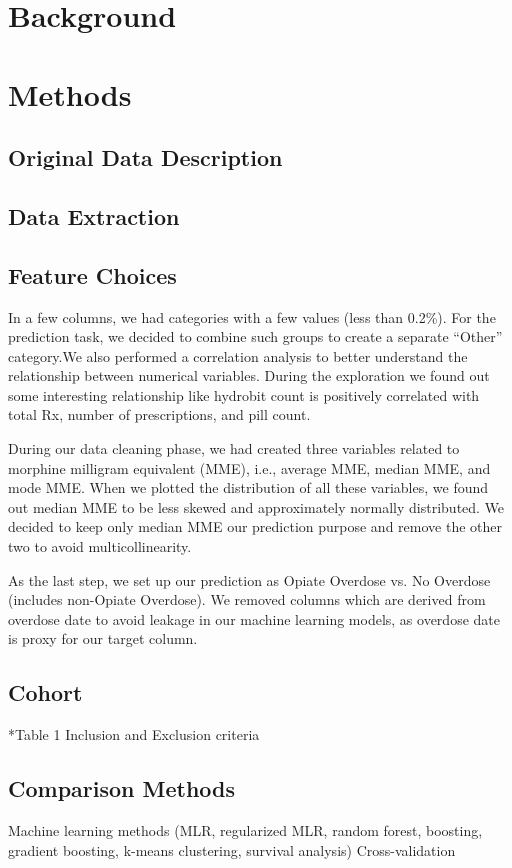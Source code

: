 \documentclass[twoside,10.5pt]{article}
\begin{document}
\section{Background}


\section{Methods}
\subsection{Original Data Description}

\subsection{Data Extraction}

\subsection{Feature Choices}
In a few columns, we had categories with a few values (less than 0.2\%). For the prediction task, we decided to combine such groups to create a separate “Other” category.We also performed a correlation analysis to better understand the relationship between numerical variables. During the exploration we found out some interesting relationship like hydrobit count is positively correlated with total Rx, number of prescriptions, and pill count.

During our data cleaning phase, we had created three variables related to morphine milligram equivalent (MME), i.e., average MME, median MME, and mode MME.  When we plotted the distribution of all these variables, we found out median MME to be less skewed and approximately normally distributed. We decided to keep only median MME our prediction purpose and remove the other two to avoid multicollinearity.

As the last step, we set up our prediction as Opiate Overdose vs. No Overdose (includes non-Opiate Overdose). We removed columns which are derived from overdose date to avoid leakage in our machine learning models, as overdose date is proxy for our target column.


\subsection{Cohort}
*Table 1
Inclusion and Exclusion criteria 


\subsection{Comparison Methods}
Machine learning methods (MLR, regularized MLR, random forest, boosting, gradient boosting, k-means clustering, survival analysis)
Cross-validation
\end{document}
